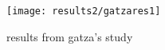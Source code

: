 \begin{appendices}
	\begin{figure}[htpb]
		\centering
		\texttt{[image: results2/gatzares1]}
		\caption{results from gatza's study}
		\label{fig:gatza_paper_res}
	\end{figure}





\end{appendices}
